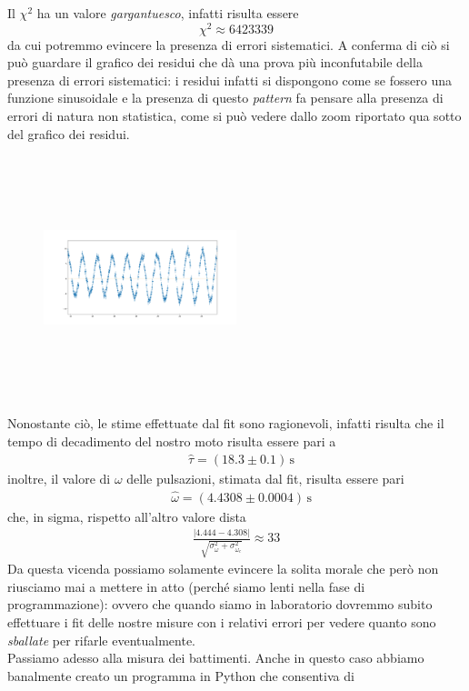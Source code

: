 \documentclass{article}
\begin{document}
Il $\chi^2$ ha un valore \emph{gargantuesco}, infatti risulta essere
$$
	\chi^2 \approx 6423339
$$
da cui potremmo evincere la presenza di errori sistematici. A conferma di ciò si può guardare il grafico dei residui che dà una prova più inconfutabile della presenza di errori sistematici: i residui infatti si dispongono come se fossero una funzione sinusoidale e la presenza di questo \emph{pattern} fa pensare alla presenza di errori di natura non statistica, come si può vedere dallo zoom riportato qua sotto del grafico dei residui.

\begin{figure}
	\includegraphics[width=0.5\textwidth, height=200pt]{Zoom_residui.png}
\end{figure}

Nonostante ciò, le stime effettuate dal fit sono ragionevoli, infatti risulta che il tempo di decadimento del nostro moto risulta essere pari a
\begin{align}
	&\hat{\tau} = (18.3 \pm 0.1) \, \si{\second}
\end{align}
inoltre, il valore di $\omega$ delle pulsazioni, stimata dal fit, risulta essere pari
\begin{align}
	&\hat{\omega} = (4.4308 \pm 0.0004) \, \si{\second}
\end{align}
che, in sigma, rispetto all'altro valore dista
\begin{align}
	\frac{|4.444 - 4.308|}{\sqrt{\sigma^2_{\omega}+ \sigma^2_{\omega_c}}} \approx 33
\end{align}
Da questa vicenda possiamo solamente evincere la solita morale che però non riusciamo mai a mettere in atto (perché siamo lenti nella fase di programmazione): ovvero che quando siamo in laboratorio dovremmo subito effettuare i fit delle nostre misure con i relativi errori per vedere quanto sono \emph{sballate} per rifarle eventualmente. \\
Passiamo adesso alla misura dei battimenti. Anche in questo caso abbiamo banalmente creato un programma in Python che consentiva di 
\end{document}
